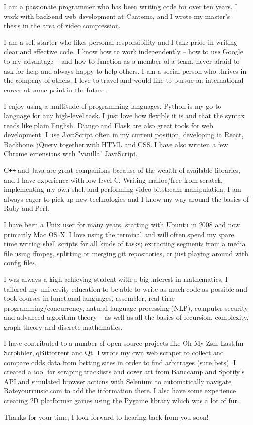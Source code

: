 I am a passionate programmer who has been writing code for over ten years. I work with back-end web development at Cantemo, and I wrote my master's thesis in the area of video compression.

I am a self-starter who likes personal responsibility and I take pride in writing clear and effective code. I know how to work independently -- how to use Google to my advantage -- and how to function as a member of a team, never afraid to ask for help and always happy to help others. I am a social person who thrives in the company of others, I love to travel and would like to pursue an international career at some point in the future.

I enjoy using a multitude of programming languages. Python is my go-to language for any high-level task. I just love how flexible it is and that the syntax reads like plain English. Django and Flask are also great tools for web development. I use JavaScript often in my current position, developing in React, Backbone, jQuery together with HTML and CSS. I have also written a few Chrome extensions with "vanilla" JavaScript.

C\texttt{++} and Java are great companions because of the wealth of available libraries, and I have experience with low-level C. Writing malloc/free from scratch, implementing my own shell and performing video bitstream manipulation. I am always eager to pick up new technologies and I know my way around the basics of Ruby and Perl.

I have been a Unix user for many years, starting with Ubuntu in 2008 and now primarily Mac OS X. I love using the terminal and will often spend my spare time writing shell scripts for all kinds of tasks; extracting segments from a media file using ffmpeg, splitting or merging git repositories, or just playing around with config files.

I was always a high-achieving student with a big interest in mathematics. I tailored my university education to be able to write as much code as possible and took courses in functional languages, assembler, real-time programming/concurrency, natural language processing (NLP), computer security and advanced algorithm theory -- as well as all the basics of recursion, complexity, graph theory and discrete mathematics.

I have contributed to a number of open source projects like Oh My Zsh, Last.fm Scrobbler, qBittorrent and Qt. I wrote my own web scraper to collect and compare odds data from betting sites in order to find arbitrages (sure bets). I created a tool for scraping tracklists and cover art from Bandcamp and Spotify's API and simulated browser actions with Selenium to automatically navigate Rateyourmusic.com to add the information there. I also have some experience creating 2D platformer games using the Pygame library which was a lot of fun.

Thanks for your time, I look forward to hearing back from you soon!
